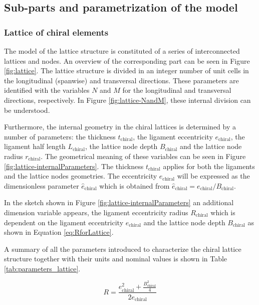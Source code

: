 \subsection{Sub-parts and parametrization of the model} \label{subsec:parametrization_Model}

\subsubsection{Lattice of chiral elements} \label{subsubsec:lattice_Parametrization}

The model of the lattice structure is constituted of a series of interconnected lattices and nodes. An overview of the corresponding part can be seen in Figure \ref{fig:lattice}. The lattice structure is divided in an integer number of unit cells in the longitudinal (spanwise) and transversal directions. These parameters are identified with the variables $N$ and $M$ for the longitudinal and transversal directions, respectively. In Figure \ref{fig:lattice-NandM}, these internal division can be understood.

Furthermore, the internal geometry in the chiral lattices is determined by a number of parameters: the thickness $t_{\mathrm{chiral}}$, the ligament eccentricity $e_{\mathrm{chiral}}$, the ligament half length $L_{\mathrm{chiral}}$, the lattice node depth $B_{\mathrm{chiral}}$ and the lattice node radius $r_{\mathrm{chiral}}$. The geometrical meaning of these variables can be seen in Figure \ref{fig:lattice-internalParameters}. The thickness $t_{\mathrm{chiral}}$ applies for both the ligaments and the lattice nodes geometries. The eccentricity $e_{\mathrm{chiral}}$ will be expressed as the dimensionless parameter $\hat{e}_{\mathrm{chiral}}$ which is obtained from $\hat{e}_{\mathrm{chiral}} = e_{\mathrm{chiral}} / B_{\mathrm{chiral}}$.

In the sketch shown in Figure \ref{fig:lattice-internalParameters} an additional dimension variable appears, the ligament eccentricity radius $R_{\mathrm{chiral}}$ which is dependent on the ligament eccentricity $e_{\mathrm{chiral}}$ and the lattice node depth $B_{\mathrm{chiral}}$ as shown in Equation \ref{eq:RforLattice}.

A summary of all the parameters introduced to characterize the chiral lattice structure together with their units and nominal values is shown in Table \ref{tab:parameters_lattice}.

\begin{equation}\label{eq:RforLattice}
  R = \frac{e_{\mathrm{chiral}}^2 + \frac{B_{\mathrm{chiral}}^2}{4}}{2e_{\mathrm{chiral}}}
\end{equation}

